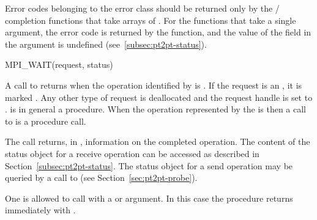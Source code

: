 Error codes belonging to the error class  should
be returned only by the \MPI/ completion functions that take arrays of
.
For the functions that take a single  argument, the
error code is returned by the function, and the value of the 
field in the  argument is undefined (see~\ref{subsec:pt2pt-status}).

\begin{funcdef}{MPI\_WAIT}{(\mbox{request}, \mbox{status})}
\end{funcdef}

A call to  returns when the operation
identified by  is .  If the request is an  ,
it is marked .  Any other type of request
is deallocated
and the request handle is set to .
 is in general a  procedure.
When the operation represented by the  is
then a call to  is a  procedure call.

The call returns, in , information on
the completed operation.  The content of the status object for a receive
operation can be accessed as
described in Section~\ref{subsec:pt2pt-status}.
The status object for a send operation may be queried by
a call to 
(see Section~\ref{sec:pt2pt-probe}).

One is allowed to call  with a  or 
 argument.
In this case the procedure returns immediately with  .

